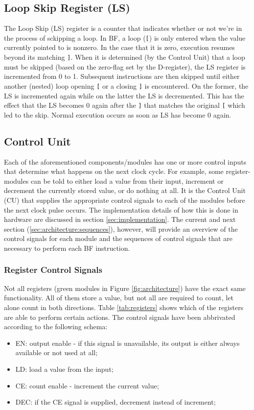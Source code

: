 \subsection{Loop Skip Register (LS)} \label{sec:architecture:loopskip}
The Loop Skip (LS) register is a counter that indicates whether or not we're in the process of sckipping a loop. In BF, a loop (\texttt{[}) is only entered when the value currently pointed to is nonzero. In the case that it is zero, execution resumes beyond its matching \texttt{]}. When it is determined (by the Control Unit) that a loop must be skipped (based on the zero-flag set by the D-register), the LS register is incremented from 0 to 1. Subsequent instructions are then skipped until either another (nested) loop opening \texttt{[} or a closing \texttt{]} is encountered. On the former, the LS is incremented again while on the latter the LS is decremented. This has the effect that the LS becomes 0 again after the \texttt{]} that matches the original \texttt{[} which led to the skip. Normal execution occurs as soon as LS has become 0 again.
    
\subsection{Control Unit} \label{sec:architecture:controlunit}
Each of the aforementioned components/modules has one or more control inputs that determine what happens on the next clock cycle. For example, some register-modules can be told to either load a value from their input, increment or decrement the currently stored value, or do nothing at all. It is the Control Unit (CU) that supplies the appropriate control signals to each of the modules before the next clock pulse occurs. The implementation details of how this is done in hardware are discussed in section \ref{sec:implementation}. The current and next section (\ref{sec:architecture:sequences}), however, will provide an overview of the control signals for each module and the sequences of control signals that are necessary to perform each BF instruction.
\subsubsection{Register Control Signals}
Not all registers (green modules in Figure \ref{fig:architecture}) have the exact same functionality. All of them store a value, but not all are required to count, let alone count in both directions. Table \ref{tab:registers} shows which of the registers are able to perform certain actions. The control signals have been abbrivated according to the following schema:
\begin{itemize}
\item EN: output enable - if this signal is unavailable, its output is either always available or not used at all;
\item LD: load a value from the input;
\item CE: count enable - increment the current value;
\item DEC: if the CE signal is supplied, decrement instead of increment;
\end{itemize}

